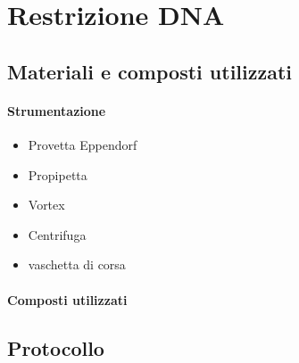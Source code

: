 \section{Restrizione DNA}
\subsection{Materiali e composti utilizzati}
\paragraph{Strumentazione}
\begin{itemize}[person]
	\item Provetta \foreignlanguage{german}{Eppendorf}
	\item Propipetta
	\item \foreignlanguage{english}{Vortex}
	\item Centrifuga
	\item vaschetta di corsa
\end{itemize}

\paragraph{Composti utilizzati}
\begin{itemize}[person]
	\itemb[Buffer 10X]
	\itemb[DNA]
	\itemb[Agarosio]
	\itemb[TAE 50X]
	\itemb[SyberSafe]
\end{itemize}

\subsection{Protocollo}
